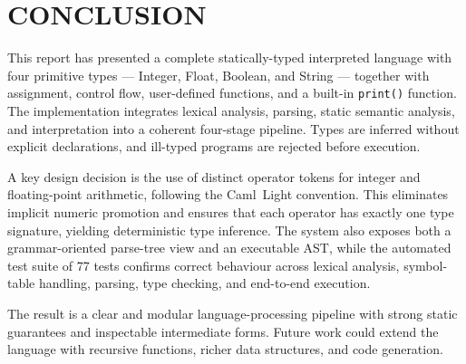 \chapter{CONCLUSION}

This report has presented a complete statically-typed interpreted language with
four primitive types --- Integer, Float, Boolean, and String --- together with
assignment, control flow, user-defined functions, and a built-in
\texttt{print()} function. The implementation integrates lexical analysis,
parsing, static semantic analysis, and interpretation into a coherent
four-stage pipeline. Types are inferred without explicit declarations, and
ill-typed programs are rejected before execution.

A key design decision is the use of distinct operator tokens for integer and
floating-point arithmetic, following the Caml~Light convention. This eliminates
implicit numeric promotion and ensures that each operator has exactly one type
signature, yielding deterministic type inference. The system also exposes both
a grammar-oriented parse-tree view and an executable AST, while the automated
test suite of 77 tests confirms correct behaviour across lexical analysis,
symbol-table handling, parsing, type checking, and end-to-end execution.

The result is a clear and modular language-processing pipeline with strong
static guarantees and inspectable intermediate forms. Future work could extend
the language with recursive functions, richer data structures, and code
generation.
